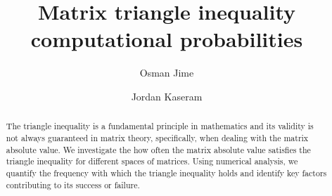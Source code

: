 \documentclass[11pt]{amsart}
\begin{document}
\title{Matrix triangle inequality computational probabilities}


\author{Osman Jime}
\author{Jordan Kaseram}
\address{Department of Mathematics and Statistics
  \\MacEwan University \\ Edmonton, AB \\Canada}

\begin{abstract}
  The triangle inequality is a fundamental principle in mathematics and its validity is not always guaranteed in matrix theory, specifically, when dealing with the matrix absolute value.
  We investigate the how often the matrix absolute value satisfies the triangle inequality for different spaces of matrices.
  Using numerical analysis, we quantify the frequency with which the triangle inequality holds and identify key factors contributing to its success or failure.
\end{abstract}



\maketitle














\end{document}
